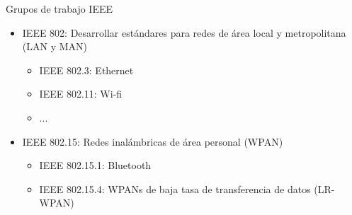\documentclass[aspectratio=169]{beamer}
\begin{document}
\begin{frame}{Grupos de trabajo IEEE} 

\begin{minipage}[c]{1.0\linewidth}
	\begin{minipage}[c]{0.6\linewidth}
		\begin{itemize}
			\item IEEE 802: Desarrollar estándares para redes de área local y metropolitana (LAN y MAN)
			\begin{itemize}
				\item IEEE 802.3: Ethernet
				\item IEEE 802.11: Wi-fi
				\item ...
			\end{itemize}
			\vspace{10px}
			\item IEEE 802.15: Redes inalámbricas de área personal (WPAN)
			\vspace{5px}
			\begin{itemize}
				\item IEEE 802.15.1: Bluetooth
				\item IEEE 802.15.4: WPANs de baja tasa de transferencia de datos (LR-WPAN)
			\end{itemize}
		\end{itemize}
	\end{minipage}
	\begin{minipage}[c]{0.35\linewidth}
		\begin{figure}[H]
			\label{OSI_model}
		\end{figure}	  	  	
	\end{minipage}
\end{minipage}
	

\end{frame}
\end{document}
